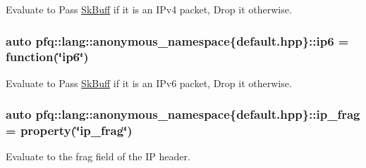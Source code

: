 Evaluate to {\ttfamily Pass} \hyperlink{structpfq_1_1lang_1_1SkBuff}{Sk\+Buff} if it is an I\+Pv4 packet, {\ttfamily Drop} it otherwise. 

\subsubsection[{\texorpdfstring{ip6}{ip6}}]{\setlength{\rightskip}{0pt plus 5cm}auto pfq\+::lang\+::anonymous\+\_\+namespace\{default.\+hpp\}\+::ip6 = {\bf function}(\char`\"{}ip6\char`\"{})}\hypertarget{namespacepfq_1_1lang_1_1anonymous__namespace_02default_8hpp_03_a5df1535f3c8090b714928b77f5a9cf18}{}\label{namespacepfq_1_1lang_1_1anonymous__namespace_02default_8hpp_03_a5df1535f3c8090b714928b77f5a9cf18}


Evaluate to {\ttfamily Pass} \hyperlink{structpfq_1_1lang_1_1SkBuff}{Sk\+Buff} if it is an I\+Pv6 packet, {\ttfamily Drop} it otherwise. 

\subsubsection[{\texorpdfstring{ip\+\_\+frag}{ip_frag}}]{\setlength{\rightskip}{0pt plus 5cm}auto pfq\+::lang\+::anonymous\+\_\+namespace\{default.\+hpp\}\+::ip\+\_\+frag = {\bf property}(\char`\"{}ip\+\_\+frag\char`\"{})}\hypertarget{namespacepfq_1_1lang_1_1anonymous__namespace_02default_8hpp_03_a46050d7137792fba0ca6d1b9cb75ad0d}{}\label{namespacepfq_1_1lang_1_1anonymous__namespace_02default_8hpp_03_a46050d7137792fba0ca6d1b9cb75ad0d}


Evaluate to the {\ttfamily frag} field of the IP header. 

